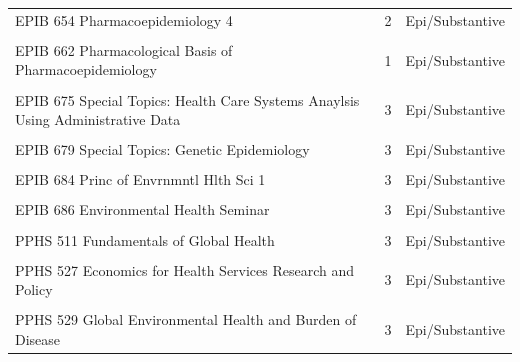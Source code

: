 \documentclass[
]{book}
\begin{document}
\begin{table}
{\begin{tabular}[t]{l|r|l}
\hline
\cellcolor{gray!6}{EPIB 648 Methods in Social Epidemiology} & \cellcolor{gray!6}{3} & \cellcolor{gray!6}{Epi/Substantive}\\
\hline
EPIB 654 Pharmacoepidemiology 4 & 2 & Epi/Substantive\\
\hline
\cellcolor{gray!6}{EPIB 661 Pharmacoepidemiology 3} & \cellcolor{gray!6}{2} & \cellcolor{gray!6}{Epi/Substantive}\\
\hline
EPIB 662 Pharmacological Basis of Pharmacoepidemiology & 1 & Epi/Substantive\\
\hline
\cellcolor{gray!6}{EPIB 671 Cancer Epidemiology\&Prevention} & \cellcolor{gray!6}{2} & \cellcolor{gray!6}{Epi/Substantive}\\
\hline
EPIB 675 Special Topics: Health Care Systems Anaylsis Using Administrative Data & 3 & Epi/Substantive\\
\hline
\cellcolor{gray!6}{EPIB 676 Special Topics: Bayesian Analysis in the Health Sciences} & \cellcolor{gray!6}{3} & \cellcolor{gray!6}{Biostatistics}\\
\hline
EPIB 679 Special Topics: Genetic Epidemiology & 3 & Epi/Substantive\\
\hline
\cellcolor{gray!6}{EPIB 681 Global Health: Epid. Research} & \cellcolor{gray!6}{3} & \cellcolor{gray!6}{Epi/Substantive}\\
\hline
EPIB 684 Princ of Envrnmntl Hlth Sci 1 & 3 & Epi/Substantive\\
\hline
\cellcolor{gray!6}{EPIB 685 Princ of Envrnmntl Hlth Sci 2} & \cellcolor{gray!6}{3} & \cellcolor{gray!6}{Epi/Substantive}\\
\hline
EPIB 686 Environmental Health Seminar & 3 & Epi/Substantive\\
\hline
\cellcolor{gray!6}{PPHS 501 Population Health and Epidemiology} & \cellcolor{gray!6}{3} & \cellcolor{gray!6}{Epi/Substantive}\\
\hline
PPHS 511 Fundamentals of Global Health & 3 & Epi/Substantive\\
\hline
\cellcolor{gray!6}{PPHS 525 Healthcare Systems in Comparative Perspective} & \cellcolor{gray!6}{3} & \cellcolor{gray!6}{Epi/Substantive}\\
\hline
PPHS 527 Economics for Health Services Research and Policy & 3 & Epi/Substantive\\
\hline
\cellcolor{gray!6}{PPHS 528 Economic Evaluation of Health Programs} & \cellcolor{gray!6}{3} & \cellcolor{gray!6}{Epi/Substantive}\\
\hline
PPHS 529 Global Environmental Health and Burden of Disease & 3 & Epi/Substantive\\

\end{tabular}}
\end{table}
\end{document}
